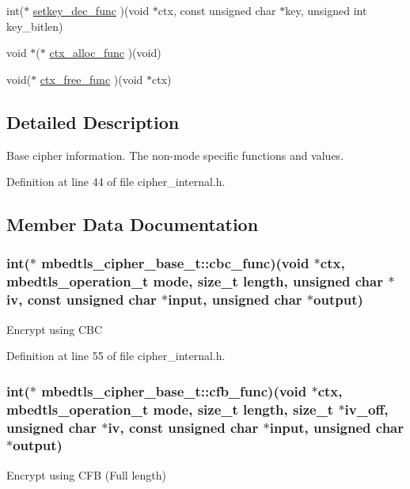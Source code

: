 \begin{DoxyCompactItemize}
\item 
int($\ast$ \hyperlink{structmbedtls__cipher__base__t_a23cd6e5b5beae65a6ff897c74ae24988}{setkey\-\_\-dec\-\_\-func} )(void $\ast$ctx, const unsigned char $\ast$key, unsigned int key\-\_\-bitlen)
\item 
void $\ast$($\ast$ \hyperlink{structmbedtls__cipher__base__t_a0ea058a70ad20f77afdbb27347e876a0}{ctx\-\_\-alloc\-\_\-func} )(void)
\item 
void($\ast$ \hyperlink{structmbedtls__cipher__base__t_aa135cf3bd8a9aba15917e1909c4e55be}{ctx\-\_\-free\-\_\-func} )(void $\ast$ctx)
\end{DoxyCompactItemize}


\subsection{Detailed Description}
Base cipher information. The non-\/mode specific functions and values. 

Definition at line 44 of file cipher\-\_\-internal.\-h.



\subsection{Member Data Documentation}
\hypertarget{structmbedtls__cipher__base__t_ae8660ce572a7631aff9d36088ed88f6d}{
\subsubsection[{cbc\-\_\-func}]{\setlength{\rightskip}{0pt plus 5cm}int($\ast$ mbedtls\-\_\-cipher\-\_\-base\-\_\-t\-::cbc\-\_\-func)(void $\ast$ctx, mbedtls\-\_\-operation\-\_\-t mode, size\-\_\-t length, unsigned char $\ast$iv, const unsigned char $\ast$input, unsigned char $\ast$output)}}\label{structmbedtls__cipher__base__t_ae8660ce572a7631aff9d36088ed88f6d}
Encrypt using C\-B\-C 

Definition at line 55 of file cipher\-\_\-internal.\-h.

\hypertarget{structmbedtls__cipher__base__t_a3e6bf51180be5dbe94774e5d1418d8dc}{
\subsubsection[{cfb\-\_\-func}]{\setlength{\rightskip}{0pt plus 5cm}int($\ast$ mbedtls\-\_\-cipher\-\_\-base\-\_\-t\-::cfb\-\_\-func)(void $\ast$ctx, mbedtls\-\_\-operation\-\_\-t mode, size\-\_\-t length, size\-\_\-t $\ast$iv\-\_\-off, unsigned char $\ast$iv, const unsigned char $\ast$input, unsigned char $\ast$output)}}\label{structmbedtls__cipher__base__t_a3e6bf51180be5dbe94774e5d1418d8dc}
Encrypt using C\-F\-B (Full length) 

